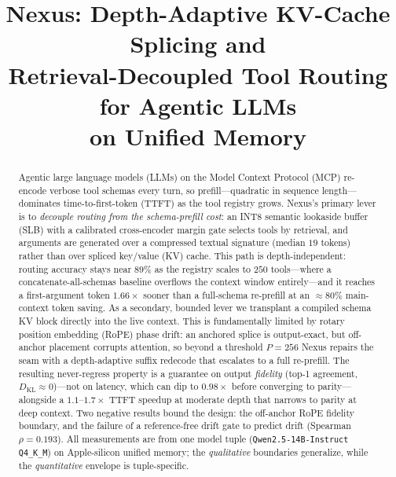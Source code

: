 \documentclass[10pt,conference]{IEEEtran}
\newcommand{\code}[1]{\texttt{\small #1}}
\begin{document}
\title{Nexus: Depth-Adaptive KV-Cache Splicing and\\
Retrieval-Decoupled Tool Routing for Agentic LLMs\\
on Unified Memory}

\author{
}

\maketitle

\begin{abstract}
Agentic large language models (LLMs) on the Model Context Protocol (MCP) re-encode verbose tool
schemas every turn, so prefill---quadratic in sequence length---dominates time-to-first-token
(TTFT) as the tool registry grows. Nexus's primary lever is to \emph{decouple routing from the
schema-prefill cost}: an INT8 semantic lookaside buffer (SLB) with a calibrated cross-encoder
margin gate selects tools by retrieval, and arguments are generated over a compressed textual
signature (median $19$ tokens) rather than over spliced key/value (KV) cache. This path is
depth-independent: routing accuracy stays near $89\%$ as the registry scales to $250$ tools---where
a concatenate-all-schemas baseline overflows the context window entirely---and it reaches a
first-argument token $1.66\times$ sooner than a full-schema re-prefill at an ${\approx}80\%$
main-context token saving. As a secondary, bounded lever we transplant a compiled schema KV block
directly into the live context. This is fundamentally limited by rotary position embedding (RoPE)
phase drift: an anchored splice is output-exact, but off-anchor placement corrupts attention, so
beyond a threshold $P=256$ Nexus repairs the seam with a depth-adaptive suffix redecode that
escalates to a full re-prefill. The resulting never-regress property is a guarantee on output
\emph{fidelity} (top-1 agreement, $D_{\mathrm{KL}}\approx 0$)---not on latency, which can dip to
$0.98\times$ before converging to parity---alongside a $1.1$--$1.7\times$ TTFT speedup at moderate
depth that narrows to parity at deep context. Two negative results bound the design: the off-anchor
RoPE fidelity boundary, and the failure of a reference-free drift gate to predict drift (Spearman
$\rho=0.193$). All measurements are from one model tuple (\code{Qwen2.5-14B-Instruct Q4\_K\_M}) on
Apple-silicon unified memory; the \emph{qualitative} boundaries generalize, while the
\emph{quantitative} envelope is tuple-specific.
\end{abstract}
\end{document}
